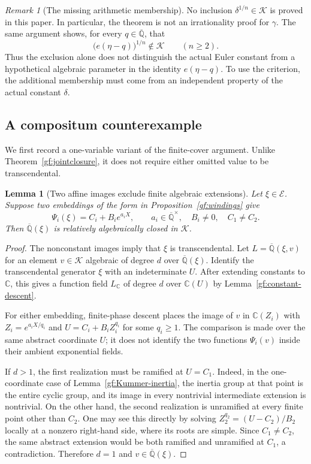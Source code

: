 \documentclass[11pt,a4paper]{article}
\numberwithin{equation}{section}
\newtheorem{lemma}[theorem]{Lemma}
\theoremstyle{definition}
\theoremstyle{remark}
\newtheorem{remark}[theorem]{Remark}
\newcommand{\A}{\overline{\mathbb Q}}
\newcommand{\Er}{\mathcal E}
\newcommand{\K}{\mathcal K}
\begin{document}
\begin{remark}[The missing arithmetic membership]\label{gf:missing-membership}
No inclusion $\delta^{1/n}\in\K$ is proved in this paper.  In
particular, the theorem is not an irrationality proof for $\gamma$.
The same argument shows, for every $q\in\A$, that
\[
 \bigl(e(\eta-q)\bigr)^{1/n}\notin\K\qquad(n\ge2).
\]
Thus the exclusion alone does not distinguish the actual Euler
constant from a hypothetical algebraic parameter in the identity
$e(\eta-q)$.  To use the criterion, the additional membership must
come from an independent property of the actual constant $\delta$.
\end{remark}

\subsection{A compositum counterexample}
\label{gf:compositum-section}

We first record a one-variable variant of the finite-cover argument.
Unlike Theorem~\ref{gf:jointclosure}, it does not require either
omitted value to be transcendental.

\begin{lemma}[Two affine images exclude finite algebraic extensions]
\label{gf:two-centers-field}
Let $\xi\in\Er$.  Suppose two embeddings of the form in
Proposition~\ref{gf:windings} give
\[
 \Psi_i(\xi)=C_i+B_i e^{a_iX},
 \qquad a_i\in\A^\times,\quad B_i\ne0,\quad C_1\ne C_2.
\]
Then $\A(\xi)$ is relatively algebraically closed in $\K$.
\end{lemma}
\begin{proof}
The nonconstant images imply that $\xi$ is transcendental.  Let
$L=\A(\xi,v)$ for an element $v\in\K$ algebraic of degree $d$ over
$\A(\xi)$.  Identify the transcendental generator $\xi$ with an
indeterminate $U$.  After extending constants to $\mathbb C$, this
gives a function field $L_{\mathbb C}$ of degree $d$ over
$\mathbb C(U)$ by Lemma~\ref{gf:constant-descent}.

For either embedding, finite-phase descent places the image of $v$
in $\mathbb C(Z_i)$ with $Z_i=e^{a_iX/q_i}$ and
$U=C_i+B_iZ_i^{q_i}$ for some $q_i\ge1$.  The comparison is made over
the same abstract coordinate $U$; it does not identify the two
functions $\Psi_i(v)$ inside their ambient exponential fields.

If $d>1$, the first realization must be ramified at $U=C_1$.
Indeed, in the one-coordinate case of
Lemma~\ref{gf:Kummer-inertia}, the inertia group at that point is
the entire cyclic group, and its image in every nontrivial intermediate
extension is nontrivial.  On the other hand, the second realization
is unramified at every finite point other than $C_2$.  One may see
this directly by solving
$Z_2^{q_2}=(U-C_2)/B_2$ locally at a nonzero right-hand side, where its
roots are simple.  Since $C_1\ne C_2$, the same abstract extension
would be both ramified and unramified at $C_1$, a contradiction.
Therefore $d=1$ and $v\in\A(\xi)$.
\end{proof}
\end{document}
